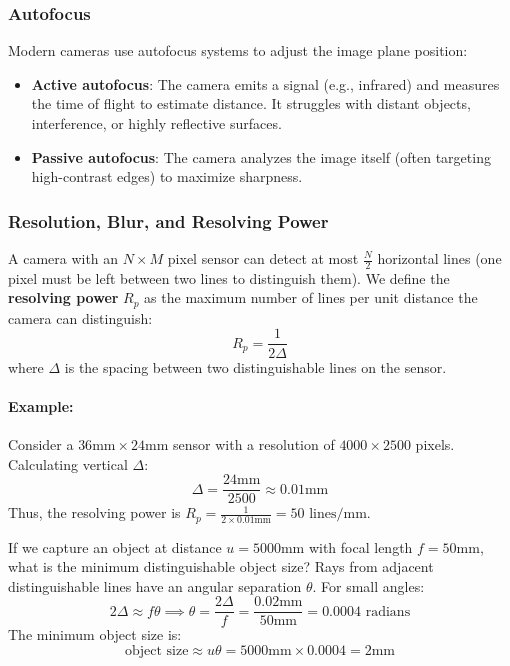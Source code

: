 \subsubsection{Autofocus}
Modern cameras use autofocus systems to adjust the image plane position:
\begin{itemize}
    \item \textbf{Active autofocus}: The camera emits a signal (e.g., infrared) and measures the time of flight to estimate distance. It struggles with distant objects, interference, or highly reflective surfaces.
    \item \textbf{Passive autofocus}: The camera analyzes the image itself (often targeting high-contrast edges) to maximize sharpness. 
\end{itemize}

\subsubsection{Resolution, Blur, and Resolving Power}
A camera with an $N \times M$ pixel sensor can detect at most $\frac{N}{2}$ horizontal lines (one pixel must be left between two lines to distinguish them). We define the \textbf{resolving power} $R_p$ as the maximum number of lines per unit distance the camera can distinguish:
\begin{equation}
    R_p = \frac{1}{2\Delta}
\end{equation}
where $\Delta$ is the spacing between two distinguishable lines on the sensor.

\paragraph{Example:}
Consider a $36\text{mm} \times 24\text{mm}$ sensor with a resolution of $4000 \times 2500$ pixels. Calculating vertical $\Delta$:
\begin{equation*}
    \Delta = \frac{24\text{mm}}{2500} \approx 0.01\text{mm}
\end{equation*}
Thus, the resolving power is $R_p = \frac{1}{2 \times 0.01\text{mm}} = 50 \text{ lines/mm}$.

If we capture an object at distance $u = 5000\text{mm}$ with focal length $f = 50\text{mm}$, what is the minimum distinguishable object size?
Rays from adjacent distinguishable lines have an angular separation $\theta$. For small angles:
\begin{equation*}
    2 \Delta \approx f \theta \implies \theta = \frac{2 \Delta}{f} = \frac{0.02\text{mm}}{50\text{mm}} = 0.0004 \text{ radians}
\end{equation*}
The minimum object size is:
\begin{equation*}
    \text{object size} \approx u \theta = 5000\text{mm} \times 0.0004 = 2\text{mm}
\end{equation*}

